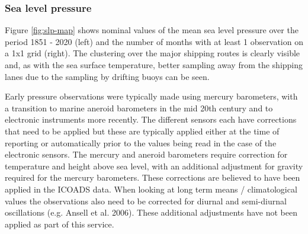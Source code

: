\FloatBarrier
\subsubsection{Sea level pressure}

Figure \ref{fig:slp-map} shows nominal values of the mean sea level pressure over the period 1851 - 2020 (left) and the number of months with at least 1 observation on a 1x1 grid (right).
The clustering over the major shipping routes is clearly visible and, as with the sea surface temperature, better sampling away from the shipping lanes due to the sampling by drifting buoys can be seen.

Early pressure observations were typically made using mercury barometers, with a transition to marine aneroid barometers in the mid 20th century and to electronic instruments more recently. 
The different sensors each have corrections that need to be applied but these are typically applied either at the time of reporting or automatically prior to the values being read in the case of the electronic sensors. 
The mercury and aneroid barometers require correction for temperature and height above sea level, with an additional adjustment for gravity required for the mercury barometers. 
These corrections are believed to have been applied in the ICOADS data.
When looking at long term means / climatological values the observations also need to be corrected for diurnal and semi-diurnal oscillations (e.g. Ansell et al. 2006). These additional adjustments have not been applied as part of this service.



